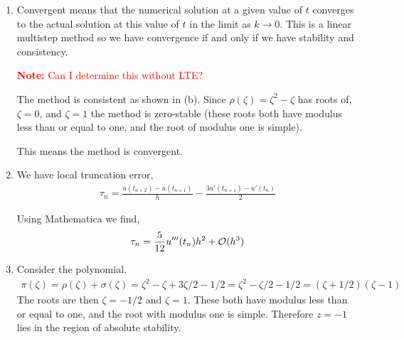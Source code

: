 \documentclass[10pt]{article}
\newcommand{\note}[1]{\textcolor{red}{\textbf{Note:} #1}}
\begin{document}
\begin{solution}[Solution]
\begin{enumerate}[label=(\alph*)]
\item Convergent means that the numerical solution at a given value of \( t \) converges to the actual solution at this value of \( t \) in the limit as \( k\to 0 \). This is a linear multistep method so we have convergence if and only if we have stability and consistency.

    \note{Can I determine this without LTE?}

    The method is consistent as shown in (b). Since \( \rho(\zeta) = \zeta^2 - \zeta \) has roots of, \( \zeta = 0 \), and \( \zeta = 1 \) the method is zero-stable (these roots both have modulus less than or equal to one, and the root of modulus one is simple).

    This means the method is convergent.


\item
    We have local truncation error,
    \begin{align*}
        \tau_n = \frac{u(t_{n+2}) - u(t_{n+1})}{h} - \frac{3u'(t_{n+1}) - u'(t_n)}{2}
    \end{align*}

    Using Mathematica we find,
    \begin{align*}
        \tau_n = \frac{5}{12}u'''(t_n) h^2 + \mathcal{O}(h^3)
    \end{align*}
    

\item 
    Consider the polynomial,
    \begin{align*}
        \pi(\zeta) = \rho(\zeta) + \sigma(\zeta) = \zeta^2 - \zeta + 3\zeta/2-1/2 = \zeta^2 -\zeta/2 - 1/2 = (\zeta+1/2)(\zeta-1)
    \end{align*}
    The roots are then \( \zeta = -1/2 \) and \( \zeta =1 \). These both have modulus less than or equal to one, and the root with modulus one is simple. Therefore \( z=-1 \) lies in the region of absolute stability.

\end{enumerate}
 
\end{solution}
\end{document}
